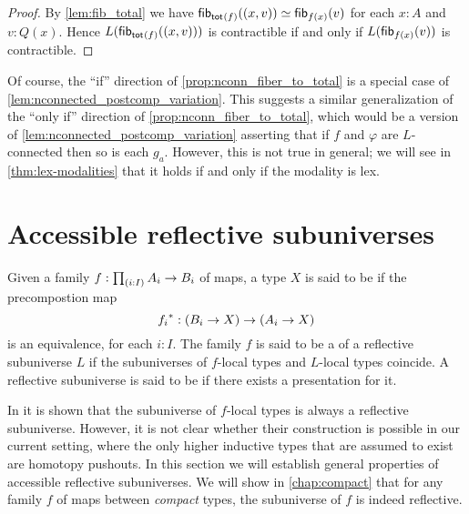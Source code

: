 \begin{proof}
By \cref{lem:fib_total} we have $\mathsf{fib}_{\mathsf{tot}_{}(f)}({\mathopen{}(x,v)\mathclose{}})\simeq\mathsf{fib}_{f(x)}(v)$
for each $x:A$ and $v:Q(x)$. Hence $L(\mathsf{fib}_{\mathsf{tot}_{}(f)}({\mathopen{}(x,v)\mathclose{}}))$ is contractible if and only if
$L(\mathsf{fib}_{f(x)}(v))$ is contractible.
\end{proof}

Of course, the ``if'' direction of \cref{prop:nconn_fiber_to_total} is a special case of \cref{lem:nconnected_postcomp_variation}.
This suggests a similar generalization of the ``only if'' direction of \cref{prop:nconn_fiber_to_total}, which would be a version of \cref{lem:nconnected_postcomp_variation} asserting that if $f$ and $\varphi$ are $L$-connected then so is each $g_a$.
However, this is not true in general; we will see in \cref{thm:lex-modalities} that it holds if and only if the modality is lex.

\section{Accessible reflective subuniverses}\label{sec:accessible}

\begin{defn}
Given a family $f:\prd{i:I}A_i\to B_i$ of maps, a type $X$ is said to be  if the precompostion map
\begin{equation*}
{f_i}^\ast:(B_i\to X)\to (A_i\to X)
\end{equation*}
is an equivalence, for each $i:I$. The family $f$ is said to be a  of a reflective subuniverse $L$ if the subuniverses of $f$-local types and $L$-local types coincide. A reflective subuniverse is said to be  if there exists a presentation for it. 
\end{defn}

In \cite{RijkeShulmanSpitters} it is shown that the subuniverse of $f$-local types is always a reflective subuniverse. However, it is not clear whether their construction is possible in our current setting, where the only higher inductive types that are assumed to exist are homotopy pushouts. In this section we will establish general properties of accessible reflective subuniverses. We will show in \cref{chap:compact} that for any family $f$ of maps between \emph{compact} types, the subuniverse of $f$ is indeed reflective. 

